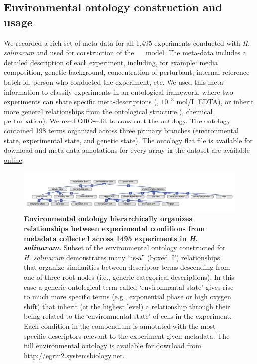 \subsection{Environmental ontology construction and usage}

We recorded a rich set of meta-data for all 1,495 experiments
conducted with {\it H. salinarum} and used for construction of the
\halo~ \egrine~model. The meta-data includes a detailed description
of each experiment, including, for example: media composition, genetic
background, concentration of perturbant, internal reference batch id,
person who conducted the experiment, etc. We used this
meta-information to classify experiments in an ontological framework,
where two experiments can share specific meta-descriptions (\eg,
$10^{-3}$ mol/L EDTA), or inherit more general relationships from the
ontological structure (\eg, chemical perturbation). We used OBO-edit
\cite{Day-Richter2007} to construct the ontology. The ontology contained 198
terms organized across three primary branches (environmental state,
experimental state, and genetic state). The ontology flat file is
available for download and meta-data annotations for every array in
the dataset are available \href{http://egrin2.systemsbiology.net}{online}.

\begin{figure}[h!]
\centering
\includegraphics[width=0.95\linewidth]{figures/eo.pdf}
\caption[Environmental ontology hierarchically organizes relationships between experimental conditions from metadata collected across 1495 experiments in \textit{H. salinarum}]{{\bf Environmental ontology hierarchically organizes relationships between experimental conditions from metadata collected across 1495 experiments in \textit{H. salinarum}.} Subset of the environmental ontology constructed for \textit{H. salinarum} demonstrates many “is-a” (boxed ‘I’) relationships that organize similarities between descriptor terms descending from one of three root nodes (i.e., generic categorical descriptions). In this case a generic ontological term called `environmental state' gives rise to much more specific terms (e.g., exponential phase or high oxygen shift) that inherit (at the highest level) a relationship through their being related to the ‘environmental state’ of cells in the experiment. Each condition in the compendium is annotated with the most specific descriptors relevant to the experiment given metadata. The full environmental ontology is available for download from \href{http://egrin2.systemsbiology.net}{http://egrin2.systemsbiology.net}.}
\label{fig:eo}
\end{figure}

